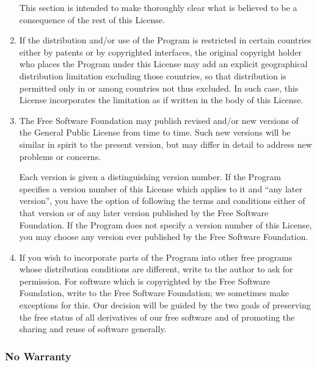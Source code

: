 \begin{enumerate}
This section is intended to make thoroughly clear what is believed to
be a consequence of the rest of this License.

\item
If the distribution and/or use of the Program is restricted in
certain countries either by patents or by copyrighted interfaces, the
original copyright holder who places the Program under this License
may add an explicit geographical distribution limitation excluding
those countries, so that distribution is permitted only in or among
countries not thus excluded.  In such case, this License incorporates
the limitation as if written in the body of this License.

\item
The Free Software Foundation may publish revised and/or new versions
of the General Public License from time to time.  Such new versions will
be similar in spirit to the present version, but may differ in detail to
address new problems or concerns.

Each version is given a distinguishing version number.  If the Program
specifies a version number of this License which applies to it and ``any
later version'', you have the option of following the terms and conditions
either of that version or of any later version published by the Free
Software Foundation.  If the Program does not specify a version number of
this License, you may choose any version ever published by the Free Software
Foundation.

\item
If you wish to incorporate parts of the Program into other free
programs whose distribution conditions are different, write to the author
to ask for permission.  For software which is copyrighted by the Free
Software Foundation, write to the Free Software Foundation; we sometimes
make exceptions for this.  Our decision will be guided by the two goals
of preserving the free status of all derivatives of our free software and
of promoting the sharing and reuse of software generally.

\end{enumerate}

\subsubsection{No Warranty}

